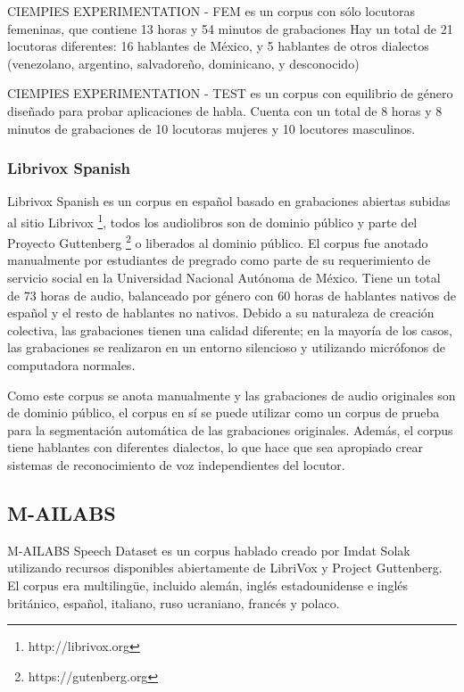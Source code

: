 CIEMPIES EXPERIMENTATION  - FEM es un corpus con sólo locutoras femeninas, que contiene 13 horas y 54 minutos de grabaciones Hay un total de 21 locutoras diferentes: 16 hablantes de México, y 5 hablantes de otros dialectos (venezolano, argentino, salvadoreño, dominicano, y desconocido)

CIEMPIES EXPERIMENTATION  - TEST es un corpus con equilibrio de género diseñado para probar aplicaciones de habla. Cuenta con un total de 8 horas y 8 minutos de grabaciones de 10 locutoras mujeres y 10 locutores masculinos.

\subsubsection {Librivox Spanish}

Librivox Spanish \cite{LibriVox-Spanish} es un corpus en español basado en grabaciones abiertas subidas al sitio Librivox \footnote{http://librivox.org}, todos los audiolibros son de dominio público y parte del Proyecto Guttenberg \footnote{https://gutenberg.org} o liberados al dominio público. El corpus fue anotado manualmente por estudiantes de pregrado como parte de su requerimiento de servicio social en la Universidad Nacional Autónoma de México. Tiene un total de 73 horas de audio, balanceado por género con 60 horas de hablantes nativos de español y el resto de hablantes no nativos. Debido a su naturaleza de creación colectiva, las grabaciones tienen una calidad diferente; en la mayoría de los casos, las grabaciones se realizaron en un entorno silencioso y utilizando micrófonos de computadora normales.

Como este corpus se anota manualmente y las grabaciones de audio originales son de dominio público, el corpus en sí se puede utilizar como un corpus de prueba para la segmentación automática de las grabaciones originales. Además, el corpus tiene hablantes con diferentes dialectos, lo que hace que sea apropiado crear sistemas de reconocimiento de voz independientes del locutor.

\subsection{M-AILABS}

M-AILABS Speech Dataset \cite{M-AILABS} es un corpus hablado creado por Imdat Solak utilizando recursos disponibles abiertamente de LibriVox y Project Guttenberg. El corpus era multilingüe, incluido alemán, inglés estadounidense e inglés británico, español, italiano, ruso ucraniano, francés y polaco.

